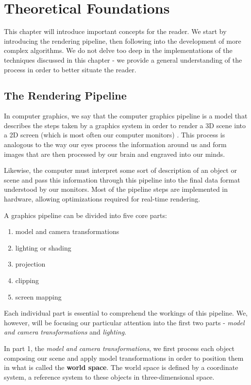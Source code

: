 \chapter{Theoretical Foundations}
\label{sec:theory}
This chapter will introduce important concepts for the reader. We start by introducing the rendering pipeline, then following into the development of more complex algorithms. We do not delve too deep in the implementations of the techniques discussed in this chapter - we provide a general understanding of the process in order to better situate the reader.

\section{The Rendering Pipeline}

In computer graphics, we say that the computer graphics pipeline is a model that describes the steps taken by a graphics system in order to render a 3D scene into a 2D screen (which is most often our computer monitors) \cite{msdn}. This process is analogous to the way our eyes process the information around us and form images that are then processed by our brain and engraved into our minds.

Likewise, the computer must interpret some sort of description of an object or scene and pass this information through this pipeline into the final data format understood by our monitors. Most of the pipeline steps are implemented in hardware, allowing optimizations required for real-time rendering. 

A graphics pipeline can be divided into five core parts: 
\begin{enumerate}
 \item model and camera transformations
 \item lighting or shading
 \item projection
 \item clipping
 \item screen mapping
\end{enumerate}

Each individual part is essential to comprehend the workings of this pipeline. We, however, will be focusing our particular attention into the first two parts - \textit{model and camera transformations} and \textit{lighting}.

In part 1, the \textit{model and camera transformations}, we first process each object composing our scene and apply model transformations in order to position them in what is called the \textbf{world space}. The world space is defined by a coordinate system, a reference system to these objects in three-dimensional space.

